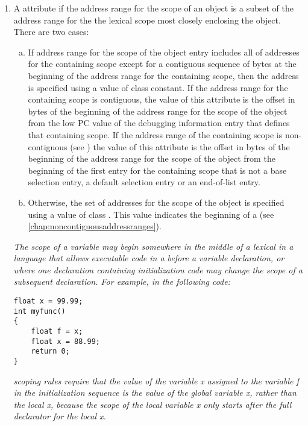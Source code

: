 \begin{enumerate}[1. ]
\item A \DWATstartscopeDEFN{}
\hypertarget{chap:DWATstartscopeobjectdeclaration}{}
attribute if the address range for the scope of an
object is a subset of the address range for the
the lexical scope most closely enclosing the object. 
There are two cases:
\begin{enumerate}[a) ]
\item If address range for the scope of the object entry 
includes all of addresses for the containing scope except 
for a contiguous sequence of bytes at the beginning of the 
address range for the containing scope, then the address is 
specified using a value of class constant. If the address
range for the containing scope is contiguous, the value of 
this attribute is the offset in bytes of the beginning of 
the address range for the scope of the object from the low 
PC value of the debugging information entry that defines
that containing scope. If the address range of the containing 
scope is non-contiguous 
(see )
the value of this attribute is the offset in bytes of the 
beginning of the address range for the scope of the object 
from the beginning of the first  entry
for the containing scope that is not a base selection entry, 
a default selection entry or an end-of-list entry.

\item Otherwise, the set of addresses for the scope of the 
object is specified using a value of class \CLASSrangelistptr{}. 
This value indicates the beginning of a 
(see \ref{chap:noncontiguousaddressranges}).
\end{enumerate}


\textit{The scope of a variable may begin somewhere in the middle of
a lexical  in a language 
that allows executable code in a
 before a variable declaration, or where one declaration
containing initialization code may change the scope of a
subsequent declaration.  For example, in the following  code:}

\begin{lstlisting}
float x = 99.99;
int myfunc()
{
    float f = x;
    float x = 88.99;
    return 0;
}
\end{lstlisting}

\textit{ scoping rules require that the value of the variable x
assigned to the variable f in the initialization sequence is
the value of the global variable x, rather than the local x,
because the scope of the local variable x only starts after
the full declarator for the local x.}


\end{enumerate}
